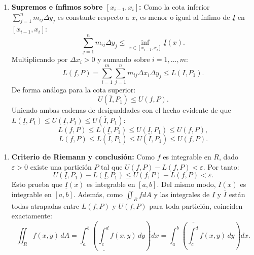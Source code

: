 \documentclass[11pt,a4paper]{article}
\begin{document}
\begin{enumerate}[label=\textbf{\arabic*.}]
\item \textbf{Supremos e ínfimos sobre $[x_{i-1}, x_i]$:}
Como la cota inferior $\sum_{j=1}^n m_{ij} \Delta y_j$ es constante respecto a $x$, es menor o igual al ínfimo de $\underline{I}$ en $[x_{i-1}, x_i]$:
\begin{equation*}
\sum_{j=1}^n m_{ij} \Delta y_j \le \inf_{x \in [x_{i-1}, x_i]} \underline{I}(x).
\end{equation*}
Multiplicando por $\Delta x_i > 0$ y sumando sobre $i = 1, \dots, m$:
\begin{equation*}
L(f, P) = \sum_{i=1}^m \sum_{j=1}^n m_{ij} \Delta x_i \Delta y_j \le L(\underline{I}, P_1).
\end{equation*}
De forma análoga para la cota superior:
\begin{equation*}
U(\overline{I}, P_1) \le U(f, P).
\end{equation*}
Uniendo ambas cadenas de desigualdades con el hecho evidente de que $L(\underline{I}, P_1) \le U(\underline{I}, P_1) \le U(\overline{I}, P_1)$:
\begin{equation*}
L(f, P) \le L(\underline{I}, P_1) \le U(\underline{I}, P_1) \le U(f, P),
\end{equation*}
\begin{equation*}
L(f, P) \le L(\overline{I}, P_1) \le U(\overline{I}, P_1) \le U(f, P).
\end{equation*}
\end{enumerate}

\begin{enumerate}[label=\textbf{\arabic*.}]
\item \textbf{Criterio de Riemann y conclusión:}
Como $f$ es integrable en $R$, dado $\varepsilon > 0$ existe una partición $P$ tal que $U(f, P) - L(f, P) < \varepsilon$.
Por tanto:
\begin{equation*}
U(\underline{I}, P_1) - L(\underline{I}, P_1) \le U(f, P) - L(f, P) < \varepsilon.
\end{equation*}
Esto prueba que $\underline{I}(x)$ es integrable en $[a,b]$. Del mismo modo, $\overline{I}(x)$ es integrable en $[a,b]$.
Además, como $\iint_R f dA$ y las integrales de $\underline{I}$ y $\overline{I}$ están todas atrapadas entre $L(f,P)$ y $U(f,P)$ para toda partición, coinciden exactamente:
\begin{equation*}
\iint_R f(x,y) \, dA = \int_a^b \left( \underline{\int_c^d} f(x,y) \, dy \right) dx = \int_a^b \left( \overline{\int_c^d} f(x,y) \, dy \right) dx.
\end{equation*}
\end{enumerate}
\end{document}
